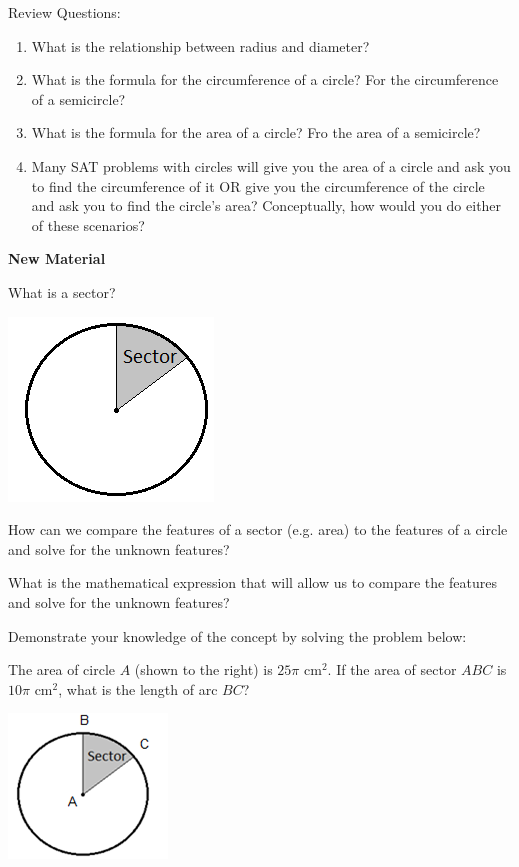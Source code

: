 \documentclass[12pt]{book}
\begin{document}
\bigskip
Review Questions:

\begin{enumerate}
\item What is the relationship between radius and diameter?
\vfill\item What is the formula for the circumference of a circle? For the circumference of a semicircle?
\vfill\item What is the formula for the area of a circle? Fro the area of a semicircle?
\vfill\item Many SAT problems with circles will give you the area of a circle and ask you to find the circumference of it OR give you the circumference of the circle and ask you to find the circle's area? Conceptually, how would you do either of these scenarios?
\end{enumerate}

\vfill
\newpage
\textbf{New Material}

\bigskip
What is a sector?

\hfill\includegraphics{16}

How can we compare the features of a sector (e.g. area) to the features of a circle and solve for the unknown features?

\vfill
What is the mathematical expression that will allow us to compare the features and solve for the unknown features?

\vfill
Demonstrate your knowledge of the concept by solving the problem below:

\bigskip
The area of circle $A$ (shown to the right) is $25\pi$ cm$^2$. If the area of sector $ABC$ is $10\pi$ cm$^2$, what is the length of arc $BC$?

\hfill\includegraphics{17}
\end{document}
